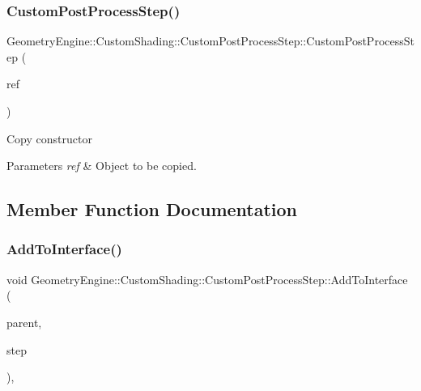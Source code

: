 \subsubsection{\texorpdfstring{CustomPostProcessStep()}{CustomPostProcessStep()}\hspace{0.1cm}{\footnotesize\ttfamily [2/2]}}
{\footnotesize\ttfamily Geometry\+Engine\+::\+Custom\+Shading\+::\+Custom\+Post\+Process\+Step\+::\+Custom\+Post\+Process\+Step (\begin{DoxyParamCaption}\item[{const \mbox{\hyperlink{class_geometry_engine_1_1_custom_shading_1_1_custom_post_process_step}{Custom\+Post\+Process\+Step}} \&}]{ref }\end{DoxyParamCaption})\hspace{0.3cm}{\ttfamily [inline]}}

Copy constructor 
\begin{DoxyParams}{Parameters}
{\em ref} & Object to be copied. \\
\hline
\end{DoxyParams}


\subsection{Member Function Documentation}
\mbox{\label{class_geometry_engine_1_1_custom_shading_1_1_custom_post_process_step_a1b561f55754b9aec463b99763f25e57b}} 
\subsubsection{\texorpdfstring{AddToInterface()}{AddToInterface()}}
{\footnotesize\ttfamily void Geometry\+Engine\+::\+Custom\+Shading\+::\+Custom\+Post\+Process\+Step\+::\+Add\+To\+Interface (\begin{DoxyParamCaption}\item[{\mbox{\hyperlink{class_geometry_engine_1_1_custom_shading_1_1_custom_post_process_step_interface}{Custom\+Post\+Process\+Step\+Interface}} $\ast$}]{parent,  }\item[{\mbox{\hyperlink{namespace_geometry_engine_1_1_custom_shading_a09e44ca81de5fe08c6d50271d680c4b1}{Custom\+Post\+Process\+Steps}}}]{step }\end{DoxyParamCaption})\hspace{0.3cm}{\ttfamily [protected]}, {\ttfamily [virtual]}}


